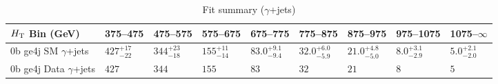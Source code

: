\documentclass[8pt]{article}
\def\scalht{\mbox{$H_{\rm{T}}$}\xspace}
\newcommand\T{\rule{0pt}{2.6ex}}
\begin{document}
\begin{table}[ht!]
\caption{Fit summary ($\gamma$+jets)}
\label{tab:ensemble-summary}
\centering
\begin{tabular}{ lllllllll }

\hline
\scalht Bin (GeV)       & 375--475                       & 475--575                       & 575--675                       & 675--775                       & 775--875                       & 875--975                       & 975--1075                      & 1075--$\infty$                 \\ [1.000000ex]
\hline
0b ge4j SM $\gamma$+jets\T & $427^{+17}_{-22}$              & $344^{+23}_{-18}$              & $155^{+11}_{-14}$              & $83.0^{+9.1}_{-9.4}$           & $32.0^{+6.0}_{-5.9}$           & $21.0^{+4.8}_{-5.0}$           & $8.0^{+3.1}_{-2.9}$            & $5.0^{+2.1}_{-2.0}$            \\ 
0b ge4j Data $\gamma$+jets\T & $427$                          & $344$                          & $155$                          & $83$                           & $32$                           & $21$                           & $8$                            & $5$                            \\ 
\hline

\end{tabular}
\end{table}
\end{document}
